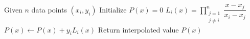 \begin{algorithm}[H]
\caption{Lagrange Interpolation}
\begin{algorithmic}[1]
\STATE Given $n$ data points $(x_i,y_i)$
\STATE Initialize $P(x) = 0$
    \STATE $L_i(x) = \prod_{\substack{j=1 \\ j \neq i}}^n \dfrac{x-x_j}{x_i-x_j}$
    \STATE $P(x) \gets P(x) + y_i L_i(x)$
\ENDFOR
\STATE Return interpolated value $P(x)$
\end{algorithmic}
\end{algorithm}